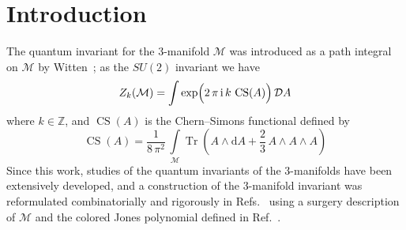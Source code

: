 \documentclass[12pt,reqno]{amsart}
\numberwithin{equation}{section}
\DeclareMathOperator{\Tr}{Tr}
\DeclareMathOperator{\CS}{CS}
\begin{document}
\begin{abstract}
We study an exact asymptotic behavior of the
Witten--Reshetikhin--Turaev SU(2) invariant for the
Brieskorn homology spheres $\Sigma(p_1,p_2,p_3)$
by use of  properties of the modular form following
a method proposed by
R.~Lawrence and D.~Zagier.
Key observation is  that the invariant coincides with a limiting value of the
Eichler integral of the modular form with weight $3/2$.
We show that the Casson invariant is related to the number
of the  Eichler integrals which do not vanish  in a limit
$\tau\to N \in \mathbb{Z}$.
Correspondingly  there is a one-to-one correspondence
between the non-vanishing Eichler integrals and
the irreducible representation of the fundamental group,
and the Chern--Simons invariant is  given from the
Eichler integral in  this limit.
It is also shown that the Ohtsuki invariant follows from a nearly modular property of the Eichler integral, and we give an explicit form in terms of the $L$-function.



\end{abstract}






\maketitle



\section{Introduction}

The quantum invariant for the 3-manifold $\mathcal{M}$
was  introduced  as a path integral on $\mathcal{M}$ by
Witten~\cite{EWitt89a};
as the $SU(2)$ invariant we have
\begin{equation}
  \label{Witten}
  Z_{k} (\mathcal{M})
  =
  \int \exp\Bigl(
    2 \, \pi \, \mathrm{i} \, k \,
    \CS(A)
  \Bigr) \,
  \mathcal{D} A
\end{equation}
where $k \in \mathbb{Z}$, and
$\CS(A)$ is the Chern--Simons functional defined by
\begin{equation}
  \CS(A)=
  \frac{1}{8 \, \pi^2} \,
  \int\limits_{\mathcal{M}}
  \Tr
  \left(
    A \wedge \mathrm{d} A +
    \frac{2}{3} \, A \wedge A \wedge A
  \right)
\end{equation}
Since this work,
studies of the quantum invariants of the 3-manifolds have
been extensively
developed,
and  a construction of the 3-manifold invariant
was reformulated combinatorially and rigorously in
Refs.~
using a surgery description of $\mathcal{M}$ and the colored Jones polynomial defined in Ref.~.
\end{document}
